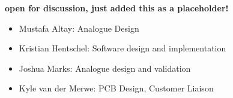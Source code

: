 \textbf{open for discussion, just added this as a placeholder!}

\begin{itemize}
	\item Mustafa Altay: Analogue Design
	\item Kristian Hentschel: Software design and implementation
	\item Joshua Marks: Analogue design and validation
	\item Kyle van der Merwe: PCB Design, Customer Liaison
\end{itemize}
